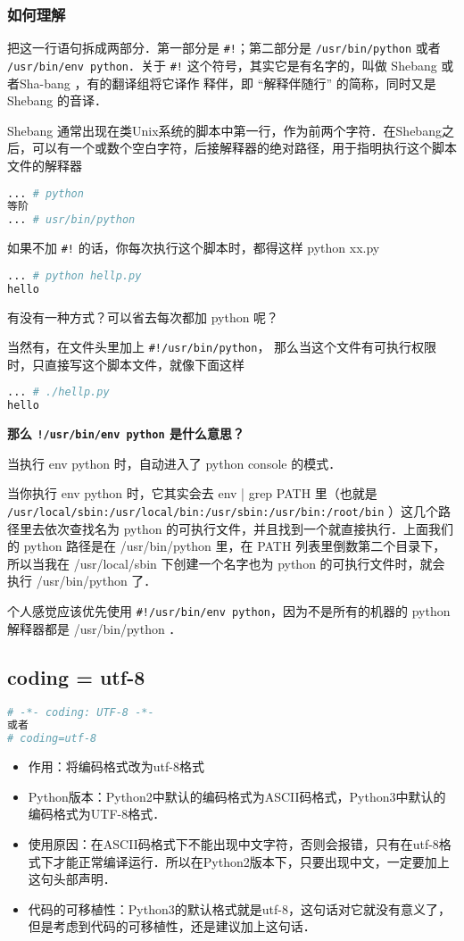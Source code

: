 \subsubsection{如何理解}
把这一行语句拆成两部分．第一部分是 \verb|#!|；第二部分是 \verb|/usr/bin/python| 或者 \verb|/usr/bin/env python|．关于 \verb|#!| 这个符号，其实它是有名字的，叫做 Shebang 或者Sha-bang ，有的翻译组将它译作 释伴，即 “解释伴随行” 的简称，同时又是 Shebang 的音译．

Shebang 通常出现在类Unix系统的脚本中第一行，作为前两个字符．在Shebang之后，可以有一个或数个空白字符，后接解释器的绝对路径，用于指明执行这个脚本文件的解释器
\begin{lstlisting}[language=bash]
... # python
等阶
... # usr/bin/python
\end{lstlisting}

如果不加 \verb|#!| 的话，你每次执行这个脚本时，都得这样 python xx.py
\begin{lstlisting}[language=bash]
... # python hellp.py
hello
\end{lstlisting}

有没有一种方式？可以省去每次都加 python 呢？

当然有，在文件头里加上 \verb|#!/usr/bin/python|， 那么当这个文件有可执行权限 时，只直接写这个脚本文件，就像下面这样
\begin{lstlisting}[language=bash]
... # ./hellp.py
hello
\end{lstlisting}

\textbf{那么 \verb|!/usr/bin/env python| 是什么意思？}

当执行 env python 时，自动进入了 python console 的模式．

当你执行 env python 时，它其实会去 env | grep PATH 里（也就是\verb| /usr/local/sbin:/usr/local/bin:/usr/sbin:/usr/bin:/root/bin| ）这几个路径里去依次查找名为 python 的可执行文件，并且找到一个就直接执行．上面我们的 python 路径是在 /usr/bin/python 里，在 PATH 列表里倒数第二个目录下，所以当我在 /usr/local/sbin 下创建一个名字也为 python 的可执行文件时，就会执行 /usr/bin/python 了．

个人感觉应该优先使用 \verb|#!/usr/bin/env python|，因为不是所有的机器的 python 解释器都是 /usr/bin/python ．

\subsection{coding = utf-8 }
\begin{lstlisting}[language=python]
# -*- coding: UTF-8 -*-
或者
# coding=utf-8
\end{lstlisting}
\begin{itemize}
\item 作用：将编码格式改为utf-8格式
\item Python版本：Python2中默认的编码格式为ASCII码格式，Python3中默认的编码格式为UTF-8格式．
\item 使用原因：在ASCII码格式下不能出现中文字符，否则会报错，只有在utf-8格式下才能正常编译运行．所以在Python2版本下，只要出现中文，一定要加上这句头部声明．
\item 代码的可移植性：Python3的默认格式就是utf-8，这句话对它就没有意义了，但是考虑到代码的可移植性，还是建议加上这句话．
\end{itemize}

